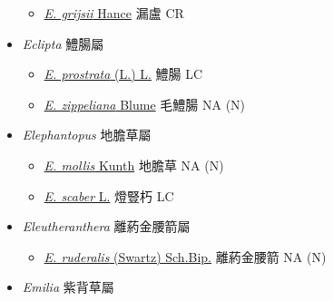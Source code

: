 \begin{itemize}
  \begin{itemize}
        \item[] \href{http://www.theplantlist.org/tpl1.1/search?q=Echinops+grijsii}{\textit{E. grijsii} Hance}   漏盧   CR
  \end{itemize}
 \item[] \textit{Eclipta} 鱧腸屬
                                
  \begin{itemize}
        \item[] \href{http://www.theplantlist.org/tpl1.1/search?q=Eclipta+prostrata}{\textit{E. prostrata} (L.) L.}   鱧腸   LC
        \item[] \href{http://www.theplantlist.org/tpl1.1/search?q=Eclipta+zippeliana}{\textit{E. zippeliana} Blume}   毛鱧腸   NA (N)
  \end{itemize}
 \item[] \textit{Elephantopus} 地膽草屬
                                
  \begin{itemize}
        \item[] \href{http://www.theplantlist.org/tpl1.1/search?q=Elephantopus+mollis}{\textit{E. mollis} Kunth}   地膽草   NA (N)
        \item[] \href{http://www.theplantlist.org/tpl1.1/search?q=Elephantopus+scaber}{\textit{E. scaber} L.}   燈豎朽   LC
  \end{itemize}
 \item[] \textit{Eleutheranthera} 離葯金腰箭屬
                                
  \begin{itemize}
        \item[] \href{http://www.theplantlist.org/tpl1.1/search?q=Eleutheranthera+ruderalis}{\textit{E. ruderalis} (Swartz) Sch.Bip.}   離葯金腰箭   NA (N)
  \end{itemize}
 \item[] \textit{Emilia} 紫背草屬
                                

\end{itemize}
